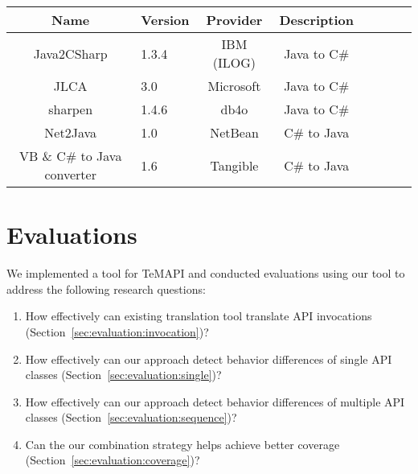 \begin{table}[t]
\centering
\begin{SmallOut}
\begin {tabular} {|c|l|c|c|c|c|c|c|}
 \hline
\textbf{Name}& \textbf{Version}& \textbf{Provider} &\textbf{Description}\\
\hline
Java2CSharp  &  1.3.4 & IBM (ILOG) & Java to C\# \\
\hline
JLCA         &  3.0   & Microsoft  & Java to C\# \\
\hline
sharpen      &  1.4.6 & db4o       & Java to C\# \\
\hline
Net2Java     &  1.0   & NetBean    &  C\# to Java\\
\hline
VB \& C\# to Java converter    &  1.6   & Tangible   &  C\# to Java\\
\hline
\end{tabular}\vspace*{-2ex}
 \label{table:subjects}
\end{SmallOut}\vspace*{-2ex}
\end{table}
\section{Evaluations}
\label{sec:evaluation}

We implemented a tool for TeMAPI and
conducted evaluations using our tool to address the following
research questions:

\vspace*{-1.5ex}
\begin{enumerate}
\item How effectively can existing translation tool translate API invocations (Section~\ref{sec:evaluation:invocation})? \vspace*{-1.8ex}
\item How effectively can our approach detect behavior differences of single API classes (Section~\ref{sec:evaluation:single})?\vspace*{-1.8ex}
\item How effectively can our approach detect behavior differences of multiple API classes (Section~\ref{sec:evaluation:sequence})?\vspace*{-1.8ex}
\item Can the our combination strategy helps achieve better coverage (Section~\ref{sec:evaluation:coverage})?
\end{enumerate}\vspace*{-1.5ex}



